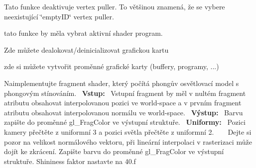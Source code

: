 \begin{DoxyRefList}
\item[\label{todo__todo000015}%
\Hypertarget{todo__todo000015}%
Global \hyperlink{group__vertexpuller__tasks_gafdfb7e3cd24d595af6650b68ba9f6f24}{G\+PU\+:\+:unbind\+Vertex\+Puller} ()]Tato funkce deaktivuje vertex puller. To většinou znamená, že se vybere neexistující \char`\"{}empty\+I\+D\char`\"{} vertex puller.  
\item[\label{todo__todo000021}%
\Hypertarget{todo__todo000021}%
Global \hyperlink{group__program__tasks_ga4f2bd468b0ef5fed61ffa34314319a20}{G\+PU\+:\+:use\+Program} (Program\+ID prg)]tato funkce by měla vybrat aktivní shader program.  
\item[\label{todo__todo000002}%
\Hypertarget{todo__todo000002}%
Global \hyperlink{group__gpu__init_gac4d153a08d3b9f40e5a8f1634f4a9e78}{G\+PU\+:\+:$\sim$\+G\+PU} ()]Zde můžete dealokovat/deinicializovat grafickou kartu  
\item[\label{todo__todo000037}%
\Hypertarget{todo__todo000037}%
Module \hyperlink{group__gpu__init}{gpu\+\_\+init} ]zde si můžete vytvořit proměnné grafické karty (buffery, programy, ...)  
\item[\label{todo__todo000039}%
\Hypertarget{todo__todo000039}%
Global \hyperlink{group__shader__side_gacad0f238507689fa275995e3aa67ce22}{phong\+\_\+\+FS} (\hyperlink{structOutFragment}{Out\+Fragment} \&out\+Fragment, \hyperlink{structInFragment}{In\+Fragment} const \&in\+Fragment, \hyperlink{structUniforms}{Uniforms} const \&uniforms)]Naimplementujte fragment shader, který počítá phongův osvětlovací model s phongovým stínováním.~\newline
 {\bfseries Vstup\+:}~\newline
 Vstupní fragment by měl v nultém fragment atributu obsahovat interpolovanou pozici ve world-\/space a v prvním fragment atributu obsahovat interpolovanou normálu ve world-\/space.~\newline
 {\bfseries Výstup\+:}~\newline
 Barvu zapište do proměnné gl\+\_\+\+Frag\+Color ve výstupní struktuře.~\newline
 {\bfseries Uniformy\+:}~\newline
 Pozici kamery přečtěte z uniformní 3 a pozici světla přečtěte z uniformní 2. ~\newline
 ~\newline
 Dejte si pozor na velikost normálového vektoru, při lineární interpolaci v rasterizaci může dojít ke zkrácení. Zapište barvu do proměnné gl\+\_\+\+Frag\+Color ve výstupní struktuře. Shininess faktor nastavte na 40.\+f ~\newline

\end{DoxyRefList}
